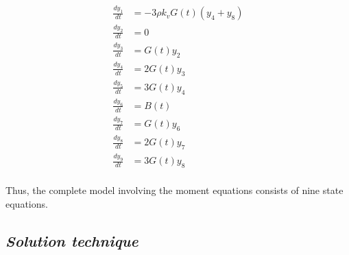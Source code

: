 \documentclass[3p,times]{elsarticle}
\begin{document}
\begin{align} 
\frac{dy_{1}}{dt} &= -3\rho k_{v}G(t)(y_{4}+y_{8}) \\
\frac{dy_{2}}{dt} &= 0 \\
\frac{dy_{3}}{dt} &= G(t)y_{2}  \\
\frac{dy_{4}}{dt} &= 2G(t)y_{3} \\
\frac{dy_{5}}{dt} &= 3G(t)y_{4} \\
\frac{dy_{6}}{dt} &= B(t)  \\
\frac{dy_{7}}{dt} &= G(t)y_{6}  \\
\frac{dy_{8}}{dt} &= 2G(t)y_{7}  \\
\frac{dy_{9}}{dt} &= 3G(t)y_{8}  \\
\end{align} 


Thus, the complete model involving the moment equations consists of nine state equations.
\subsection{\textit{Solution technique}} 
\end{document}
